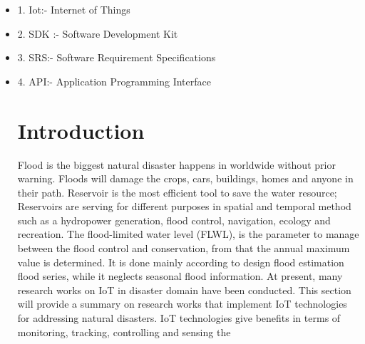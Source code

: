 \documentclass[a4paper,12pt]{report}
\begin{document}
\begin{itemize}
\item 1. Iot:- Internet of Things
\item 2. SDK :- Software Development Kit
\item 3. SRS:- Software Requirement Specifications
\item 4. API:- Application Programming Interface







\noindent
\newpage

\large

\pagestyle{fancy}

\lhead{}


\rhead{\thepage}




\vspace{0.1in}
\vspace{0.1in}


\chapter {Introduction}
Flood is the biggest natural disaster happens in worldwide without prior warning. Floods will damage the crops, cars, buildings, homes and anyone in their path. Reservoir is the most efficient tool to save the water resource; Reservoirs are serving for different purposes in spatial and temporal method such as a hydropower generation, flood control, navigation, ecology and recreation. The flood-limited water level (FLWL), is the parameter to manage between the flood control and conservation, from that the annual maximum value is determined. It is done mainly according to design flood estimation flood series, while it neglects seasonal flood information. At present, many research works on IoT in disaster domain have been conducted. This section will provide a summary on research works that implement IoT technologies for addressing natural disasters. IoT technologies give benefits in terms of monitoring, tracking, controlling and sensing the 


\end{itemize}
\end{document}
